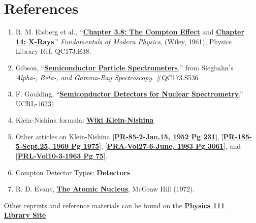 \documentclass{../lab}
\begin{document}
\section{References}
\label{sec:References}

\begin{enumerate}
    \item R. M. Eisberg et al., ``\href{http://physics111.lib.berkeley.edu/Physics111/Reprints/COM/Ch.\%203.8\%20The\%20compton\%20effect\%20pg\%2081-86.pdf}{\textbf{Chapter 3.8: The Compton Effect}} and \href{http://physics111.lib.berkeley.edu/Physics111/Reprints/COM/Ch.\%2014\%20X-rays.pdf}{\textbf{Chapter 14: X-Rays}}.'' \emph{Fundamentals of Modern Physics}, (Wiley, 1961), Physics Library Ref. QC173.E38.

    \item Gibson, ``\href{http://physics111.lib.berkeley.edu/Physics111/Reprints/COM/02-Semiconductor\_Particle\_Spectrometers.pdf}{\textbf{Semiconductor Particle Spectrometers}},'' from Siegbahn's \emph{Alpha-, Beta-, and Gamma-Ray Spectroscopy}. \#QC173.S536

    \item F. Goulding, ``\href{http://physics111.lib.berkeley.edu/Physics111/Reprints/COM/COM\_Detectors/01-UCRL-16231.pdf}{\textbf{Semiconductor Detectors for Nuclear Spectrometry}}.'' UCRL-16231

    \item Klein-Nishina formula: \href{http://physics111.lib.berkeley.edu/Physics111/Reprints/COM/Klein\_Nishina-Wiki.pdf}{\textbf{Wiki Klein-Nishina}}

    \item Other articles on Klein-Nishina [\href{http://physics111.lib.berkeley.edu/Physics111/Reprints/COM/Klein\%20Nishina-p231\_1.pdf}{\textbf{PR-85-2-Jan.15, 1952 Pg 231}}],  [\href{http://physics111.lib.berkeley.edu/Physics111/Reprints/COM/Klein\%20Nishina-p1975\_1.pdf}{\textbf{PR-185-5-Sept.25, 1969 Pg 1975}}],  [\href{http://physics111.lib.berkeley.edu/Physics111/Reprints/COM/Klein\%20Nishina-p3061\_1.pdf}{\textbf{PRA-Vol27-6-June, 1983 Pg 3061}}], and [\href{http://physics111.lib.berkeley.edu/Physics111/Reprints/COM/Klein\%20Nishina\_p75\_1.pdf}{\textbf{PRL-Vol10-3-1963 Pg 75}}].

    \item Compton Detector Types: \href{http://physics111.lib.berkeley.edu/Physics111/Reprints/COM/COM\_index.html}{\textbf{Detectors}}

    \item R. D. Evans, \href{http://physics111.lib.berkeley.edu/Physics111/Reprints/R.D.Evans\%20Atomic\%20Nucleus/The\%20Atomic\%20Nucleus\%20Evans\%20full\%20text.pdf}{\textbf{The Atomic Nucleus}}, McGraw Hill (1972).

\end{enumerate}

Other reprints and reference materials can be found on the \href{http://physics111.lib.berkeley.edu/Physics111/Reprints/COM/COM\_index.html}{\textbf{Physics 111 Library Site}}
\end{document}
